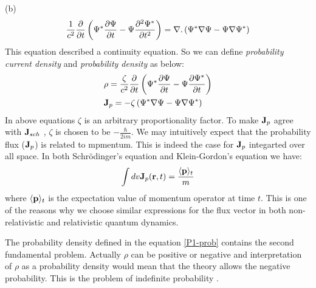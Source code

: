 \begin{homeworkProblem}
\begin{homeworkSection}{(b)}
\begin{equation}
\frac{1}{c^2}\dfrac{\partial}{\partial t}\left(\Psi^*\dfrac{\partial \Psi}{\partial t}-\Psi\dfrac{\partial^2 {\Psi^*}}{\partial {t}^2}\right)=\nabla.\left(\Psi^*\nabla\Psi-\Psi\nabla\Psi^*\right)
\end{equation}
This equation described a continuity equation. So we can define \textit{probability current density} and \textit{probability density} as below:
\begin{align}
&\rho=\frac{\zeta}{c^2}\frac{\partial}{\partial t}\left(\Psi^*\dfrac{\partial \Psi}{\partial t}-\Psi\dfrac{\partial \Psi^*}{\partial t}\right)\label{P1-prob}\\
&\mathbf{J}_{p}=-\zeta\left(\Psi^*\nabla\Psi-\Psi\nabla\Psi^*\right)\label{P1-J}
\end{align}
In above equations $\zeta$ is an arbitrary proportionality factor. To make $\mathbf{J}_{p}$ agree with $\mathbf{J}_{sch}$ , $\zeta$ is chosen to be $-\frac{\hbar}{2im}$. We may intuitively expect that the probability flux ($\mathbf{J}_p$) is related to mpmentum. This is indeed the case for $\mathbf{J}_p$ integarted over all space. In both Schr\"odinger's equation and Klein-Gordon's equation we have:
\begin{equation}\label{P1-ex}
\int dv\mathbf{J}_{p}(\mathbf{r},t)=\frac{\langle \mathbf{p}\rangle_t}{m}
\end{equation}
where $\langle \mathbf{p}\rangle_t$ is the expectation value of momentum operator at time $t$. This is one of the reasons why we choose similar expressions for the flux vector in both non-relativistic and relativistic quantum dynamics. 

 The probability density  defined in the equation 
\eqref{P1-prob} contains the second fundamental problem. Actually $\rho$ can be positive or negative and interpretation of $\rho$ as a probability density would mean that the theory allows the negative probability. This is the problem of indefinite probability \cite{greiner-relativistic_QM}.    



\end{homeworkSection}

\end{homeworkProblem}